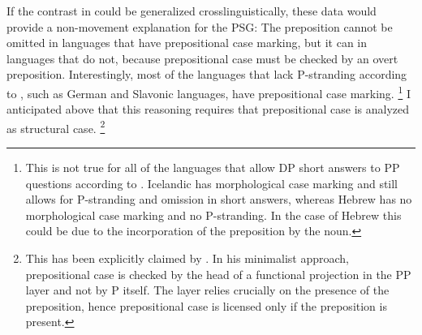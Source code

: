 \begin{sloppypar}\noindent
If the contrast in \LLast could be generalized crosslinguistically, these data would provide a non-movement explanation for the PSG: The preposition cannot be omitted in languages that have prepositional case marking, but it can in languages that do not, because prepositional case must be checked by an overt preposition. Interestingly, most of the languages that lack P-stranding according to \citet{merchant2004}, such as German and Slavonic languages, have prepositional case marking.%
%
\footnote{This is not true for all of the languages that allow DP short answers to PP questions according to \citet{merchant2004}. Icelandic has morphological case marking and still allows for P-stranding and omission in short answers, whereas Hebrew has no morphological case marking and no P-stranding. In the case of Hebrew this could be due to the incorporation of the preposition by the noun. %
}\afterfn%
%
I anticipated above that this reasoning requires that prepositional case is analyzed as structural case.%
% 
\footnote{%
This has been explicitly claimed by \citet[24]{dendikken2013}. In his minimalist approach, prepositional case is checked by the head of a functional projection in the PP layer and not by P itself. The layer relies crucially on the presence of the preposition, hence prepositional case is licensed only if the preposition is present.}\afterfn%
%

\end{sloppypar}
